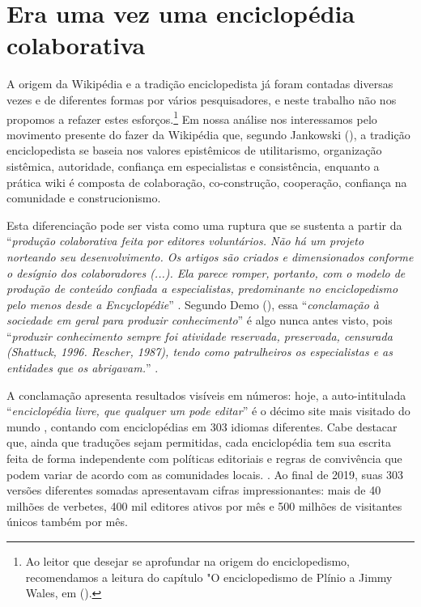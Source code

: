 \section{Era uma vez uma enciclopédia colaborativa}

A origem da Wikipédia e a tradição enciclopedista já foram contadas diversas vezes e de diferentes formas por vários pesquisadores, e neste trabalho não nos propomos a refazer estes esforços.\footnote{Ao leitor que desejar se aprofundar na origem do enciclopedismo, recomendamos a leitura do capítulo "O enciclopedismo de Plínio a Jimmy Wales, em (\cite{esteves_as_2014}).} Em nossa análise nos interessamos pelo movimento presente do fazer da Wikipédia que, segundo Jankowski (\citeyear{jankowski_wikipedia_2013}), a tradição enciclopedista se baseia nos valores epistêmicos de utilitarismo, organização sistêmica, autoridade, confiança em especialistas e consistência, enquanto a prática wiki é composta de colaboração, co-construção, cooperação, confiança na comunidade e construcionismo. 

Esta diferenciação pode ser vista como uma ruptura que se sustenta a partir da ``\textit{produção colaborativa feita por editores voluntários. Não há um projeto norteando seu desenvolvimento. Os artigos são criados e dimensionados conforme o desígnio dos colaboradores (...). Ela parece romper, portanto, com o modelo de produção de conteúdo confiada a especialistas, predominante no enciclopedismo pelo menos desde a Encyclopédie}''  \citep[p.61]{esteves_as_2014}. Segundo Demo (\citeyear{demo_conhecimento_2009}), essa ``\textit{conclamação à sociedade em geral para produzir conhecimento}'' é algo nunca antes visto, pois ``\textit{produzir conhecimento sempre foi atividade reservada, preservada, censurada (Shattuck, 1996. Rescher, 1987), tendo como patrulheiros os especialistas e as entidades que os abrigavam.}'' \citep{demo_conhecimento_2009}.

A conclamação apresenta resultados visíveis em números: hoje, a auto-intitulada ``\textit{enciclopédia livre, que qualquer um pode editar}'' é o décimo site mais visitado do mundo \citep{alexa_2019}, contando com enciclopédias em 303 idiomas diferentes. Cabe destacar que, ainda que traduções sejam permitidas, cada enciclopédia tem sua escrita feita de forma independente   com políticas editoriais e regras de convivência que podem variar de acordo com as comunidades locais. \citep{marques_wikipedia_2013}. Ao final de 2019, suas 303 versões diferentes somadas apresentavam cifras impressionantes: mais de 40 milhões de verbetes, 400 mil editores ativos por mês e 500 milhões de visitantes únicos também por mês. \citep{wikimedia_stats_2019}

